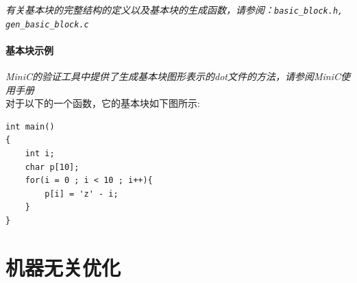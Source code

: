 {\it \anchor 有关基本块的完整结构的定义以及基本块的生成函数，请参阅：\verb|basic_block.h, gen_basic_block.c|}\\
\paragraph*{基本块示例}
{\it \manerrarrow MiniC的验证工具中提供了生成基本块图形表示的dot文件的方法，请参阅MiniC使用手册}\\
对于以下的一个函数，它的基本块如下图所示:
\begin{lstlisting}
int main()
{
	int i;
	char p[10];
	for(i = 0 ; i < 10 ; i++){
		p[i] = 'z' - i;
	}
}
\end{lstlisting}
\section{机器无关优化}
\label{indepopt}

